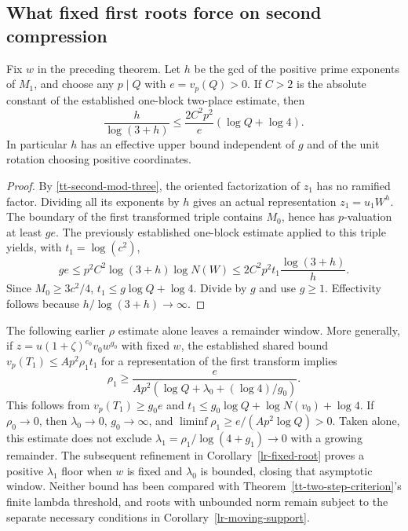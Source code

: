\subsection{What fixed first roots force on second compression}
\begin{theorem}\label{tt-fixed-root-content}
Fix $w$ in the preceding theorem. Let $h$ be the gcd of the positive prime
exponents of $M_1$, and choose any $p\mid Q$ with $e=v_p(Q)>0$.
If $C>2$ is the absolute constant of the established one-block two-place
estimate, then
\[
 \frac{h}{\log(3+h)}\le
 \frac{2C^2p^2}{e}(\log Q+\log4).
\]
In particular $h$ has an effective upper bound independent of $g$ and of the
unit rotation choosing positive coordinates.
\end{theorem}
\begin{proof}
By \eqref{tt-second-mod-three}, the oriented factorization of $z_1$ has no
ramified factor. Dividing all its exponents by $h$ gives an actual
representation $z_1=u_1W^h$. The boundary of the first transformed triple
contains $M_0$, hence has $p$-valuation at least $ge$.
The previously established one-block estimate applied to this triple yields,
with $t_1=\log(c^2)$,
\[
 ge\le p^2 C^2\log(3+h)\log N(W)
 \le2C^2p^2t_1\frac{\log(3+h)}h.
\]
Since $M_0\ge3c^2/4$,
$t_1\le g\log Q+\log4$. Divide by $g$ and use $g\ge1$.
Effectivity follows because $h/\log(3+h)\to\infty$.
\end{proof}

The following earlier $\rho$ estimate alone leaves a remainder window.
More generally, if
$z=u(1+\zeta)^{e_0}v_0w^{g_0}$ with fixed $w$, the established shared bound
$v_p(T_1)\le A p^2\rho_1t_1$ for a representation of the first transform
implies
\[
 \rho_1\ge
 \frac{e}{A p^2(\log Q+\lambda_0+(\log4)/g_0)}.
\]
This follows from $v_p(T_1)\ge g_0e$ and
$t_1\le g_0\log Q+\log N(v_0)+\log4$.
If $\rho_0\to0$, then $\lambda_0\to0$, $g_0\to\infty$, and
$\liminf\rho_1\ge e/(A p^2\log Q)>0$.
Taken alone, this estimate does not exclude
$\lambda_1=\rho_1/\log(4+g_1)\to0$ with a growing remainder.
The subsequent refinement in Corollary~\ref{lr-fixed-root} proves a positive
$\lambda_1$ floor when $w$ is fixed and $\lambda_0$ is bounded, closing
that asymptotic window. Neither bound has been compared with
Theorem~\ref{tt-two-step-criterion}'s finite lambda threshold, and roots
with unbounded norm remain subject to the separate necessary conditions in
Corollary~\ref{lr-moving-support}.


